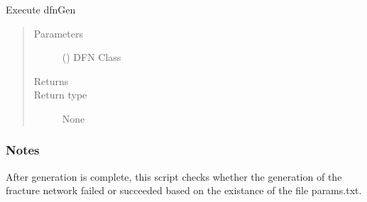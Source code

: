 \documentclass[letterpaper,10pt,english]{sphinxmanual}
\begin{document}
\begin{fulllineitems}
\label{\detokenize{pydfnworks:pydfnworks.dfnGen.generator.create_network}}
Execute dfnGen
\begin{quote}\begin{description}
\item[{Parameters}] \leavevmode
{} () \textendash{} DFN Class

\item[{Returns}] \leavevmode


\item[{Return type}] \leavevmode
None

\end{description}\end{quote}
\subsubsection*{Notes}

After generation is complete, this script checks whether the generation of the fracture network failed or succeeded based on the existance of the file params.txt.

\end{fulllineitems}

\end{document}
